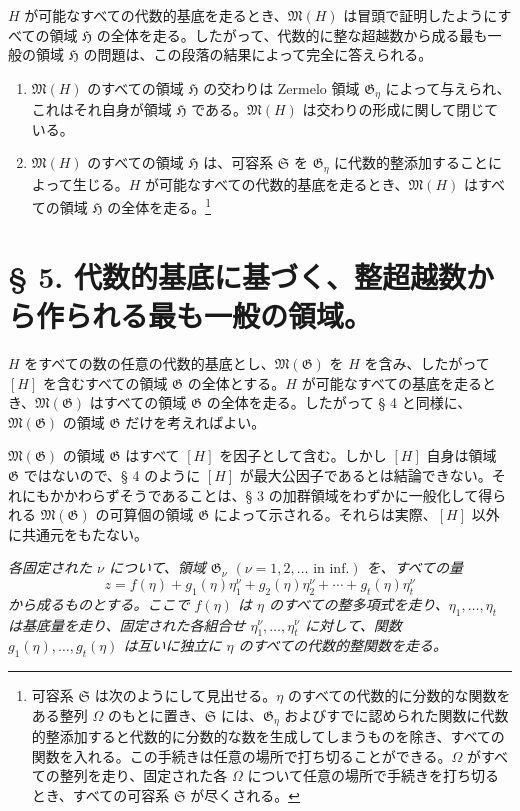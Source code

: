 $H$ が可能なすべての代数的基底を走るとき、$\mathfrak M(H)$ は冒頭で証明したようにすべての領域 $\mathfrak H$ の全体を走る。したがって、代数的に整な超越数から成る最も一般の領域 $\mathfrak H$ の問題は、この段落の結果によって完全に答えられる。
\begin{enumerate}
\item[a)] $\mathfrak M(H)$ のすべての領域 $\mathfrak H$ の交わりは Zermelo 領域 $\mathfrak G_\eta$ によって与えられ、これはそれ自身が領域 $\mathfrak H$ である。$\mathfrak M(H)$ は交わりの形成に関して閉じている。
\item[b)] $\mathfrak M(H)$ のすべての領域 $\mathfrak H$ は、可容系 $\mathfrak S$ を $\mathfrak G_\eta$ に代数的整添加することによって生じる。$H$ が可能なすべての代数的基底を走るとき、$\mathfrak M(H)$ はすべての領域 $\mathfrak H$ の全体を走る。\footnote{可容系 $\mathfrak S$ は次のようにして見出せる。$\eta$ のすべての代数的に分数的な関数をある整列 $\Omega$ のもとに置き、$\mathfrak S$ には、$\mathfrak G_\eta$ およびすでに認められた関数に代数的整添加すると代数的に分数的な数を生成してしまうものを除き、すべての関数を入れる。この手続きは任意の場所で打ち切ることができる。$\Omega$ がすべての整列を走り、固定された各 $\Omega$ について任意の場所で手続きを打ち切るとき、すべての可容系 $\mathfrak S$ が尽くされる。}
\end{enumerate}

\section*{§ 5. 代数的基底に基づく、整超越数から作られる最も一般の領域。}

$H$ をすべての数の任意の代数的基底とし、$\mathfrak M(\mathfrak G)$ を $H$ を含み、したがって $[H]$ を含むすべての領域 $\mathfrak G$ の全体とする。$H$ が可能なすべての基底を走るとき、$\mathfrak M(\mathfrak G)$ はすべての領域 $\mathfrak G$ の全体を走る。したがって § 4 と同様に、$\mathfrak M(\mathfrak G)$ の領域 $\mathfrak G$ だけを考えればよい。

$\mathfrak M(\mathfrak G)$ の領域 $\mathfrak G$ はすべて $[H]$ を因子として含む。しかし $[H]$ 自身は領域 $\mathfrak G$ ではないので、§ 4 のように $[H]$ が最大公因子であるとは結論できない。それにもかかわらずそうであることは、§ 3 の加群領域をわずかに一般化して得られる $\mathfrak M(\mathfrak G)$ の可算個の領域 $\mathfrak G$ によって示される。それらは実際、$[H]$ 以外に共通元をもたない。

\emph{各固定された $\nu$ について、領域 $\mathfrak G_\nu$ $(\nu=1,2,\ldots\text{ in inf.})$ を、すべての量}
\begin{equation}
z=f(\eta)+g_1(\eta)\eta_1^\nu+g_2(\eta)\eta_2^\nu+\cdots+g_t(\eta)\eta_t^\nu
\tag{1}
\end{equation}
\emph{から成るものとする。ここで $f(\eta)$ は $\eta$ のすべての整多項式を走り、$\eta_1,\ldots,\eta_t$ は基底量を走り、固定された各組合せ $\eta_1^\nu,\ldots,\eta_t^\nu$ に対して、関数 $g_1(\eta),\ldots,g_t(\eta)$ は互いに独立に $\eta$ のすべての代数的整関数を走る。}

